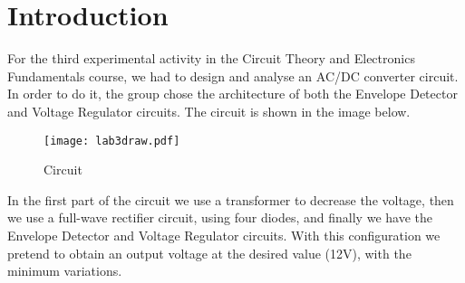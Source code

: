 \section{Introduction}

For the third experimental activity in the Circuit Theory and Electronics Fundamentals course, we had to design and analyse an AC/DC converter circuit. In order to do it, the group chose the architecture of both the Envelope Detector and Voltage Regulator circuits. The circuit is shown in the image below.

\begin{figure}[ht] \centering
\texttt{[image: lab3draw.pdf]}
\caption{Circuit}
\label{fig:circ}
\end{figure}

\par
In the first part of the circuit we use a transformer to decrease the voltage, then we use a full-wave rectifier circuit, using four diodes, and finally we have the Envelope Detector and Voltage Regulator circuits. With this configuration we pretend to obtain an output voltage at the desired value (12V), with the minimum variations.



\clearpage

